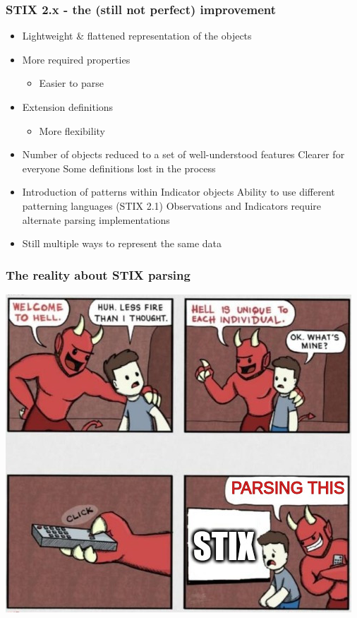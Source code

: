 \begin{frame}
    \frametitle{STIX 2.x - the (still not perfect) improvement}
    \begin{itemize}
        \item Lightweight \& flattened representation of the objects
        \item More required properties
        \begin{itemize}
            \item Easier to parse
        \end{itemize}
        \item Extension definitions
        \begin{itemize}
            \item More flexibility
        \end{itemize}
        \item Number of objects reduced to a set of well-understood features
        \linebreak \faPlusCircle \hspace{0.3em} Clearer for everyone
        \linebreak \faMinusCircle \hspace{0.3em} Some definitions lost in the process
        \item Introduction of patterns within Indicator objects
        \linebreak \faPlusCircle \hspace{0.3em} Ability to use different patterning languages (STIX 2.1)
        \linebreak \faMinusCircle \hspace{0.3em} Observations and Indicators require alternate parsing implementations
        \item Still multiple ways to represent the same data
    \end{itemize}
\end{frame}

\begin{frame}
    \frametitle{The reality about STIX parsing}
    \centering
    \includegraphics[scale=0.45]{images/hell.png}
\end{frame}

